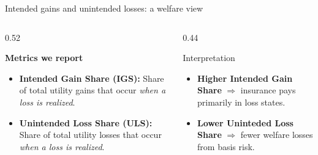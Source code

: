 \documentclass{beamer}
\begin{document}
\begin{frame}{Intended gains and unintended losses: a welfare view}
  \small
  
  \begin{columns}[T,onlytextwidth]
  \setlength{\columnsep}{14pt}
  
  \begin{column}{0.52\linewidth}
  \raggedright
  
  
  \textbf{Metrics we report}
  \medskip

  \begin{itemize}\itemsep4pt
      \item \textbf{Intended Gain Share (IGS):}  
      Share of total utility gains that occur \emph{when a loss is realized}.
      
      \item \textbf{Unintended Loss Share (ULS):}  
      Share of total utility losses that occur \emph{when a loss is realized}.
  \end{itemize}
  
  \end{column}
  
  \begin{column}{0.44\linewidth}
  \raggedright
  
  \begin{block}{Interpretation}
  \begin{itemize}\itemsep4pt
      \item \textbf{Higher Intended Gain Share} $\Rightarrow$ insurance pays primarily in loss states.
      \item \textbf{Lower Uninteded Loss Share} $\Rightarrow$ fewer welfare losses from basis risk.
  \end{itemize}
  \end{block}
  
  \end{column}
  \end{columns}
  
  \end{frame}
  

  
  
\end{document}
